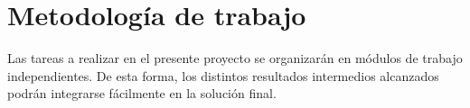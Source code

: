 \chapter{Metodología de trabajo}
\label{chap:metodologia}
\onehalfspacing

Las tareas a realizar en el presente proyecto se organizarán en módulos de trabajo independientes. De esta forma, los distintos resultados intermedios alcanzados podrán integrarse fácilmente en la solución final.


